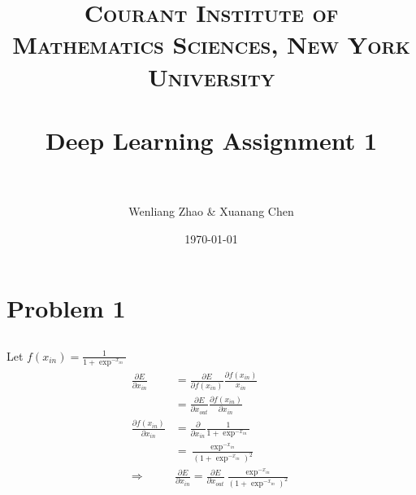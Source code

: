 \documentclass[paper=a4, fontsize=11pt]{scrartcl} %
\title{	
\normalfont \normalsize 
\textsc{Courant Institute of Mathematics Sciences, New York University} \\ [25pt] %
\horrule{0.5pt} \\[0.4cm] %
\huge Deep Learning Assignment 1 \\ %
\horrule{2pt} \\[0.5cm] %
}
\author{Wenliang Zhao \& Xuanang Chen} %
\date{\normalsize\today} %
\numberwithin{equation}{section} %
\numberwithin{figure}{section} %
\numberwithin{table}{section} %
\begin{document}
\maketitle %




\section{Problem 1}



\subsection{}
Let $f(x_{in}) = \frac{1}{1 + \exp^{-x_{in}}}$\\
\begin{align} 
\begin{split}
\frac{\partial E}{\partial x_{in}} &= \frac{\partial E}{\partial f(x_{in})} \frac{\partial f(x_{in})}{x_{in}}\\
&=\frac{\partial E}{\partial x_{out}} \frac{\partial f(x_{in})}{\partial x_{in}}\\
\frac{\partial f(x_{in})}{\partial x_{in}} &= \frac{\partial}{\partial x_{in}} \frac{1}{1 + \exp^{-x_{in}}}\\
&=\frac{\exp^{-x_{in}}}{(1 + \exp^{-x_{in}})^2}\\
\Longrightarrow & \frac{\partial E}{\partial x_{in}} = \frac{\partial E}{\partial x_{out}} \frac{\exp^{-x_{in}}}{(1 + \exp^{-x_{in}})^2}
\end{split}         
\end{align}




\subsection{}

\end{document}
